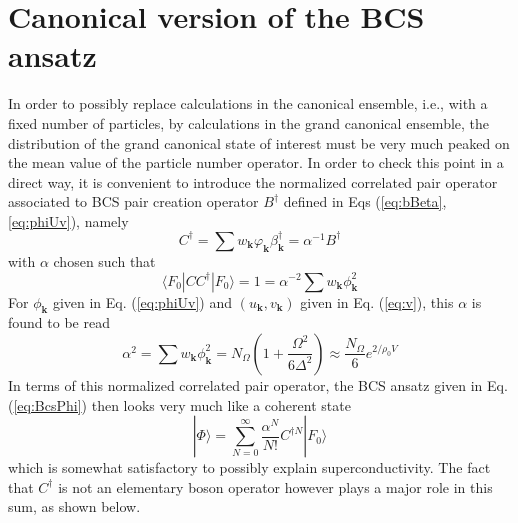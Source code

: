 \documentclass[aps,prb,preprint,groupedaddress,amsmath]{revtex4-1}
\newcommand{\vk}{\ensuremath{\mathbf{k}}}
\newcommand{\dg}{\ensuremath{\dagger}}
\begin{document}
\section{Canonical version of the BCS ansatz}
In order to possibly replace calculations in the  canonical ensemble, i.e., with a fixed number of particles, by calculations in the grand canonical ensemble, the  distribution of the grand canonical state of interest  must be very much peaked on the mean value of the particle number operator.  In order to check this point in a direct way, it is convenient to introduce the normalized correlated pair operator associated to BCS pair creation operator $B^\dg$ defined in Eqs (\ref{eq:bBeta},\ref{eq:phiUv}), namely
\begin{equation}\label{eq:c}
{C}^\dg=\sum{w_\vk}{\varphi}_\vk\beta^\dg_\vk=\alpha^{-1}B^\dg
\end{equation} 
with $\alpha$ chosen such that 
\begin{equation}
\langle{}F_0|CC^\dg|F_0\rangle=1=\alpha^{-2}\sum{w_\vk}\phi_\vk^2
\end{equation}
For $\phi_\vk$ given in Eq. (\ref{eq:phiUv}) and $(u_\vk,v_\vk)$ given in Eq. (\ref{eq:v}), this $\alpha$ is found to be read
\begin{equation}\label{eq:alpha}
\alpha^{2}=\sum{w_\vk}\phi_\vk^2=N_\Omega\left(1+\frac{\Omega^2}{6\Delta^2}\right)\approx\frac{N_\Omega}6e^{2/\rho_0V}
\end{equation}
In terms of this normalized correlated pair operator, the BCS ansatz given in Eq. (\ref{eq:BcsPhi}) then looks very much like a coherent state
\begin{equation}
|\Phi{\rangle}=\sum^\infty_{N=0}\frac{\alpha^N}{N!}C^{\dg{}N}|F_0{\rangle}
\label{eq:BcsPhiNorl}
\end{equation}
which is somewhat satisfactory to possibly explain superconductivity. The fact that $C^\dg$ is not an elementary boson operator however plays a major role in this sum, as shown below.
\end{document}
